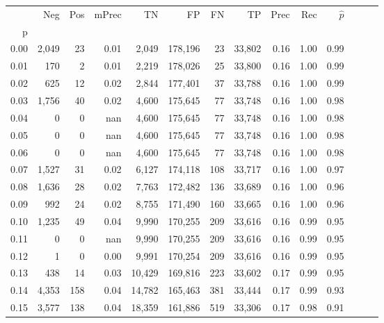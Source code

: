 \begin{tabular}{rrrrrrrrrrrrrr}
\toprule
{} &     Neg &    Pos & mPrec &       TN &       FP &      FN &      TP &  Prec &   Rec & $\hat{p}$ \\
p    &         &        &       &          &          &         &         &       &       &           \\
\midrule
0.00 &   2,049 &     23 &  0.01 &    2,049 &  178,196 &      23 &  33,802 &  0.16 &  1.00 &      0.99 \\
0.01 &     170 &      2 &  0.01 &    2,219 &  178,026 &      25 &  33,800 &  0.16 &  1.00 &      0.99 \\
0.02 &     625 &     12 &  0.02 &    2,844 &  177,401 &      37 &  33,788 &  0.16 &  1.00 &      0.99 \\
0.03 &   1,756 &     40 &  0.02 &    4,600 &  175,645 &      77 &  33,748 &  0.16 &  1.00 &      0.98 \\
0.04 &       0 &      0 &   nan &    4,600 &  175,645 &      77 &  33,748 &  0.16 &  1.00 &      0.98 \\
0.05 &       0 &      0 &   nan &    4,600 &  175,645 &      77 &  33,748 &  0.16 &  1.00 &      0.98 \\
0.06 &       0 &      0 &   nan &    4,600 &  175,645 &      77 &  33,748 &  0.16 &  1.00 &      0.98 \\
0.07 &   1,527 &     31 &  0.02 &    6,127 &  174,118 &     108 &  33,717 &  0.16 &  1.00 &      0.97 \\
0.08 &   1,636 &     28 &  0.02 &    7,763 &  172,482 &     136 &  33,689 &  0.16 &  1.00 &      0.96 \\
0.09 &     992 &     24 &  0.02 &    8,755 &  171,490 &     160 &  33,665 &  0.16 &  1.00 &      0.96 \\
0.10 &   1,235 &     49 &  0.04 &    9,990 &  170,255 &     209 &  33,616 &  0.16 &  0.99 &      0.95 \\
0.11 &       0 &      0 &   nan &    9,990 &  170,255 &     209 &  33,616 &  0.16 &  0.99 &      0.95 \\
0.12 &       1 &      0 &  0.00 &    9,991 &  170,254 &     209 &  33,616 &  0.16 &  0.99 &      0.95 \\
0.13 &     438 &     14 &  0.03 &   10,429 &  169,816 &     223 &  33,602 &  0.17 &  0.99 &      0.95 \\
0.14 &   4,353 &    158 &  0.04 &   14,782 &  165,463 &     381 &  33,444 &  0.17 &  0.99 &      0.93 \\
0.15 &   3,577 &    138 &  0.04 &   18,359 &  161,886 &     519 &  33,306 &  0.17 &  0.98 &      0.91 \\

\end{tabular}
